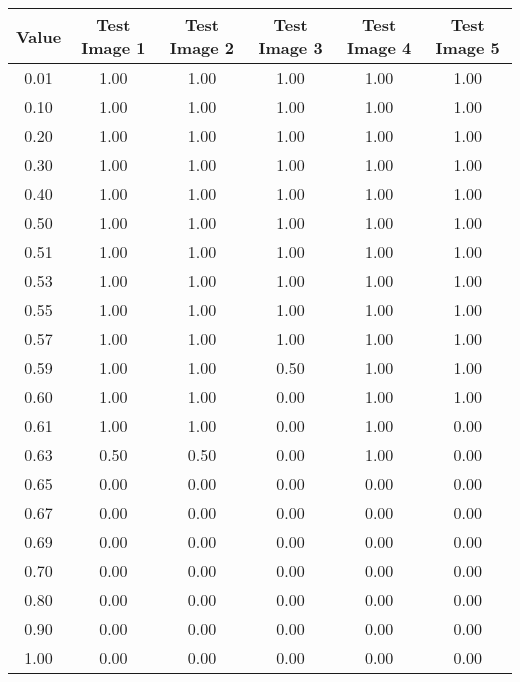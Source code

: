 \begin{tabular}{|c|c|c|c|c|c|}
\hline
\textbf{Value}&\textbf{Test Image 1}&\textbf{Test Image 2}&\textbf{Test Image 3}&\textbf{Test Image 4}&\textbf{Test Image 5}\\\hline
0.01&1.00&1.00&1.00&1.00&1.00\\\hline
0.10&1.00&1.00&1.00&1.00&1.00\\\hline
0.20&1.00&1.00&1.00&1.00&1.00\\\hline
0.30&1.00&1.00&1.00&1.00&1.00\\\hline
0.40&1.00&1.00&1.00&1.00&1.00\\\hline
0.50&1.00&1.00&1.00&1.00&1.00\\\hline
0.51&1.00&1.00&1.00&1.00&1.00\\\hline
0.53&1.00&1.00&1.00&1.00&1.00\\\hline
0.55&1.00&1.00&1.00&1.00&1.00\\\hline
0.57&1.00&1.00&1.00&1.00&1.00\\\hline
0.59&1.00&1.00&0.50&1.00&1.00\\\hline
0.60&1.00&1.00&0.00&1.00&1.00\\\hline
0.61&1.00&1.00&0.00&1.00&0.00\\\hline
0.63&0.50&0.50&0.00&1.00&0.00\\\hline
0.65&0.00&0.00&0.00&0.00&0.00\\\hline
0.67&0.00&0.00&0.00&0.00&0.00\\\hline
0.69&0.00&0.00&0.00&0.00&0.00\\\hline
0.70&0.00&0.00&0.00&0.00&0.00\\\hline
0.80&0.00&0.00&0.00&0.00&0.00\\\hline
0.90&0.00&0.00&0.00&0.00&0.00\\\hline
1.00&0.00&0.00&0.00&0.00&0.00\\\hline
\end{tabular}

